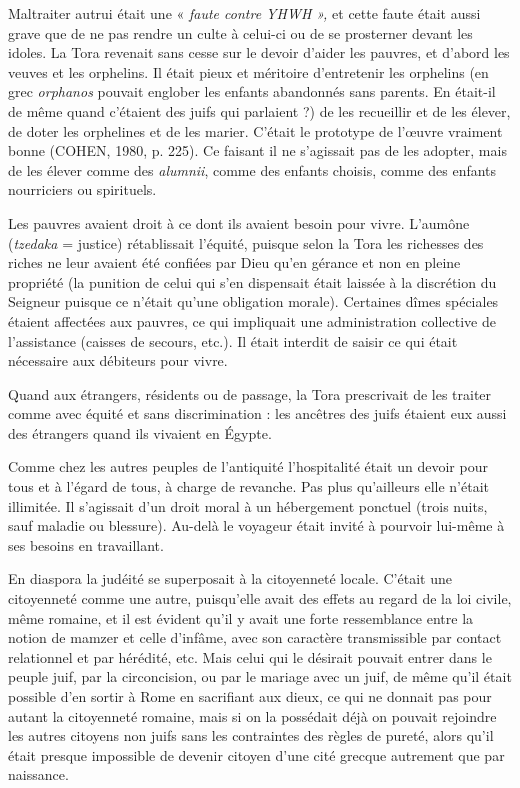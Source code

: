  Maltraiter autrui était une « \emph{faute contre YHWH »,} et cette faute était aussi grave que de ne pas rendre un culte à celui-ci ou de se prosterner devant les idoles. La Tora revenait sans cesse sur le devoir d'aider les pauvres, et d'abord les veuves et les orphelins. Il était pieux et méritoire d'entretenir les orphelins (en grec \emph{orphanos} pouvait englober les enfants abandonnés sans parents. En était-il de même quand c'étaient des juifs qui parlaient ?) de les recueillir et de les élever, de doter les orphelines et de les marier. C'était le prototype de l'œuvre vraiment bonne (COHEN, 1980, p. 225). Ce faisant il ne s'agissait pas de les adopter, mais de les élever comme des \emph{alumnii}, comme des enfants choisis, comme des enfants nourriciers ou spirituels. 

 Les pauvres avaient droit à ce dont ils avaient besoin pour vivre. L'aumône (\emph{tzedaka} = justice) rétablissait l'équité, puisque selon la Tora les richesses des riches ne leur avaient été confiées par Dieu qu'en gérance et non en pleine propriété (la punition de celui qui s'en dispensait était laissée à la discrétion du Seigneur puisque ce n'était qu'une obligation morale). Certaines dîmes spéciales étaient affectées aux pauvres, ce qui impliquait une administration collective de l'assistance (caisses de secours, etc.). Il était interdit de saisir ce qui était nécessaire aux débiteurs pour vivre. 

 Quand aux étrangers, résidents ou de passage, la Tora prescrivait de les traiter comme avec équité et sans discrimination : les ancêtres des juifs étaient eux aussi des étrangers quand ils vivaient en Égypte. 

 Comme chez les autres peuples de l'antiquité l'hospitalité était un devoir pour tous et à l'égard de tous, à charge de revanche. Pas plus qu'ailleurs elle n'était illimitée. Il s'agissait d'un droit moral à un hébergement ponctuel (trois nuits, sauf maladie ou blessure). Au-delà le voyageur était invité à pourvoir lui-même à ses besoins en travaillant. 

 En diaspora la judéité se superposait à la citoyenneté locale. C'était une citoyenneté comme une autre, puisqu'elle avait des effets au regard de la loi civile, même romaine, et il est évident qu'il y avait une forte ressemblance entre la notion de mamzer et celle d'infâme, avec son caractère transmissible par contact relationnel et par hérédité, etc. Mais celui qui le désirait pouvait entrer dans le peuple juif, par la circoncision, ou par le mariage avec un juif, de même qu'il était possible d'en sortir à Rome en sacrifiant aux dieux, ce qui ne donnait pas pour autant la citoyenneté romaine, mais si on la possédait déjà on pouvait rejoindre les autres citoyens non juifs sans les contraintes des règles de pureté, alors qu'il était presque impossible de devenir citoyen d'une cité grecque autrement que par naissance.

